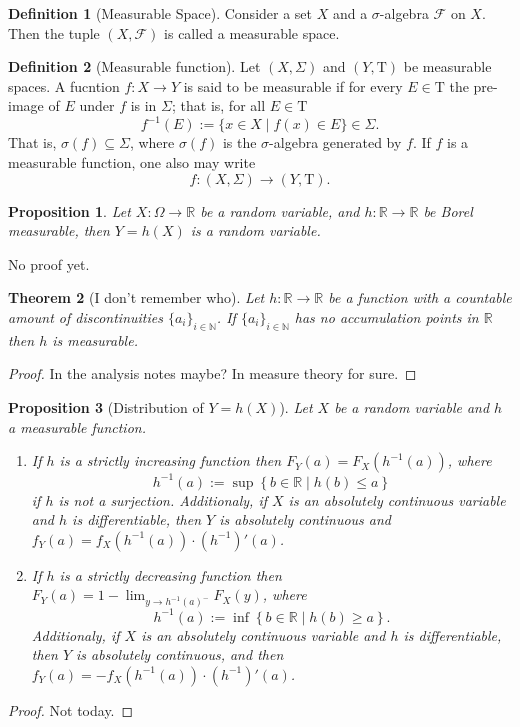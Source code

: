 \documentclass[11pt,a4paper]{article}
\theoremstyle{definition}
\newtheorem{definition}{Definition}[section]
\theoremstyle{plain}
\newtheorem{theorem}{Theorem}[section]
\newtheorem{proposition}[theorem]{Proposition}
\newcommand{\N}{\mathbb{N}}
\newcommand{\R}{\mathbb{R}}
\newcommand{\set}[2]{ \left\{ #1 \mid #2 \right\} }
\begin{document}
  \begin{definition}[Measurable Space]
    Consider a set $X$ and a $\sigma$-algebra $\mathcal F$ on $X$.
    Then the tuple $(X,{\mathcal {F}})$ is called a measurable space.
  \end{definition}
  \begin{definition}[Measurable function]
    Let $(X, \Sigma)$ and $(Y, \mathrm{T})$ be measurable spaces. A fucntion
    $f \colon X \to Y$ is said to be measurable if for every $E \in \mathrm{T}$
    the pre-image of $E$ under $f$ is in $\Sigma$; that is, for all 
    $E \in \mathrm{T}$
    \[
      f^{-1}(E):=\{x\in X\mid f(x)\in E\}\in \Sigma .
    \]
    That is, $\sigma(f) \subseteq \Sigma$, where $\sigma(f)$ is the
    $\sigma$-algebra generated by $f$. If $f$ is a measurable function,
    one also may write
    \[
      f \colon (X, \Sigma) \rightarrow (Y, \mathrm{T}).
    \]
  \end{definition}
  
  \begin{proposition}
    Let $X \colon \Omega \to \R$ be a random variable, and $h \colon \R \to \R$
    be Borel measurable, then $Y = h(X)$ is a random variable.
  \end{proposition}
  No proof yet.

  \begin{theorem}[I don't remember who]
    Let $h \colon \R \to \R$ be a function with a countable amount of 
    discontinuities $\{a_i\}_{i \in \N}$. If $\{a_i\}_{i \in \N}$ has no
    accumulation points in $\R$ then $h$ is measurable.
  \end{theorem}
  \begin{proof}
    In the analysis notes maybe? In measure theory for sure.
  \end{proof}

  \begin{proposition}[Distribution of $Y = h(X)$]
    Let $X$ be a random variable and $h$ a measurable function.
    \begin{enumerate}
      \item
      If $h$ is a strictly increasing function then $F_Y(a) = F_X(h^{-1}(a))$,
      where 
      \[ h^{-1}(a) := \sup\set{b \in \R}{h(b) \le a} \] 
      if $h$ is not
      a surjection. Additionaly, if $X$ is an absolutely continuous variable
      and $h$ is differentiable, 
      then $Y$ is absolutely continuous and 
      $f_Y(a) = f_X(h^{-1}(a)) \cdot (h^{-1})'(a)$.
      \item
      If $h$ is a strictly decreasing function then 
      $F_Y(a) = 1 - \lim_{y \to h^{-1}(a)^-} F_X(y)$,
      where
      \[ h^{-1}(a) := \inf\set{b \in \R}{h(b) \geq a}. \]
      Additionaly, if $X$ is an absolutely continuous variable
      and $h$ is differentiable, then $Y$ is absolutely continuous,
      and then $f_Y(a) = -f_X(h^{-1}(a)) \cdot (h^{-1})'(a)$. 
    \end{enumerate}
  \end{proposition}
  \begin{proof}
    Not today.
  \end{proof}
\end{document}
